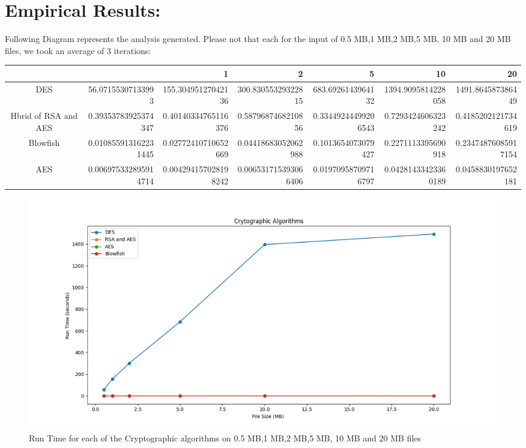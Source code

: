 \documentclass[a4paper]{report} %
\begin{document}
\chapter{Empirical Results:} 
Following Diagram represents the analysis generated. Please not that each for the input of 0.5 MB,1 MB,2 MB,5 MB, 10 MB and 20 MB files, we took an average of 3 iterations: \\ 
\begin{center}
\begin{tabular}{ |c|n{5}{2}|n{5}{2}|n{5}{2}|n{5}{2}|n{5}{2}|n{5}{2}|} 
 \hline

  &  & 1 & 2 & 5 & 10 & 20  \\ 
 \hline 
 DES & 56.07155307133993 & 155.30495127042136 & 300.83055329322815 & 683.6926143964132 & 1394.9095814228058 & 1491.864587386449  \\ 
 \hline 
 Hbrid of RSA and AES & 0.39353783925374347 & 0.40140334765116376  & 0.5879687468210856 & 0.33449244499206543 & 0.7293424606323242 & 0.4185202121734619  \\ 
 \hline 
 Blowfish & 0.010855913162231445 &  0.02772410710652669 & 0.04418683052062988 & 0.1013654073079427 & 0.2271113395690918 & 0.23474876085917154\\ 
 \hline 
 AES & 0.006975332895914714 & 0.004294157028198242 & 0.006531715393066406 & 0.01970958709716797 & 0.04281433423360189 & 0.0458830197652181\\
 \hline
\end{tabular}
\end{center}

\begin{figure}[ht]
\centering
\includegraphics[width=1\textwidth]{images/FINAL.png}
\caption{Run Time for each of the Cryptographic algorithms on 0.5 MB,1 MB,2 MB,5 MB, 10 MB and 20 MB files}
\end{figure}
\end{document}

